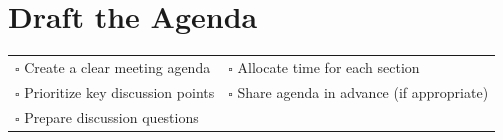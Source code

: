 
\section{Draft the Agenda}
\label{sec:agenda}

\begin{tabular}{p{9cm} p{8cm}}
$\square$ Create a clear meeting agenda & $\square$ Allocate time for each section \\ 
$\square$ Prioritize key discussion points & $\square$ Share agenda in advance (if appropriate) \\ 
$\square$ Prepare discussion questions & \\ 
\end{tabular}

